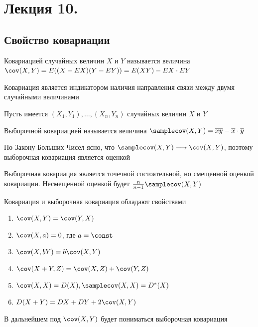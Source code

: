 \documentclass[12pt]{article}
\begin{document}





\section{Лекция 10.}

\subsection{Свойство ковариации}

\Mem Ковариацией случайных величин $X$ и $Y$ называется величина $\cov (X, Y) = E((X - EX)(Y - EY)) = E(XY) - EX \cdot EY$

Ковариация является индикатором наличия направления связи между двумя случайными величинами

Пусть имеется $(X_1, Y_1), \dots, (X_n, Y_n)$ случайных величин $X$ и $Y$

\Def Выборочной ковариацией называется величина $\samplecov (X, Y) = \overline{xy} - \overline{x} \cdot \overline{y}$

По Закону Больших Чисел ясно, что $\samplecov (X, Y) \longrightarrow \cov (X, Y)$, поэтому выборочная ковариация является оценкой

\begin{MyTheorem}
    \Ths Выборочная ковариация является точечной состоятельной, но смещенной оценкой ковариации. 
    Несмещенной оценкой будет $\frac{n}{n - 1} \samplecov (X, Y)$
\end{MyTheorem}

Ковариация и выборочная ковариация обладают свойствами

\begin{enumerate}
    \item $\cov (X, Y) = \cov (Y, X)$
    \item $\cov (X, a) = 0$, где $a = \const$
    \item $\cov (X, bY) = b \cov (X, Y)$
    \item $\cov (X + Y, Z) = \cov (X, Z) + \cov (Y, Z)$
    \item $\cov (X, X) = D(X), \samplecov (X, X) = D^* (X)$
    \item $D(X + Y) = DX + DY + 2\cov (X, Y)$
\end{enumerate}

\Nota В дальнейшем под $\cov (X, Y)$ будет пониматься выборочная ковариация

\hypertarget{linear_regression_hypothesis}{}
\end{document}
